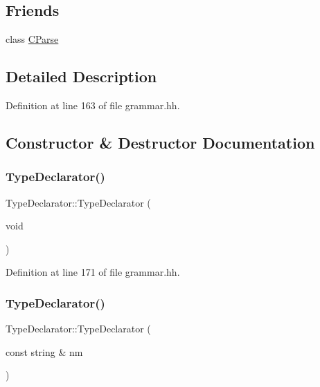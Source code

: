 \subsection*{Friends}
\begin{DoxyCompactItemize}
\item 
class \mbox{\hyperlink{class_type_declarator_a64fbc03374b5d67634430ade1bcbbadd}{C\+Parse}}
\end{DoxyCompactItemize}


\subsection{Detailed Description}


Definition at line 163 of file grammar.\+hh.



\subsection{Constructor \& Destructor Documentation}
\mbox{\label{class_type_declarator_a11bb06dfe9a9b13f10f9c6d04f852926}} 
\subsubsection{\texorpdfstring{TypeDeclarator()}{TypeDeclarator()}\hspace{0.1cm}{\footnotesize\ttfamily [1/2]}}
{\footnotesize\ttfamily Type\+Declarator\+::\+Type\+Declarator (\begin{DoxyParamCaption}\item[{void}]{ }\end{DoxyParamCaption})\hspace{0.3cm}{\ttfamily [inline]}}



Definition at line 171 of file grammar.\+hh.

\mbox{\label{class_type_declarator_a91e78ac3a94f17f0cd24e4b7be994593}} 
\subsubsection{\texorpdfstring{TypeDeclarator()}{TypeDeclarator()}\hspace{0.1cm}{\footnotesize\ttfamily [2/2]}}
{\footnotesize\ttfamily Type\+Declarator\+::\+Type\+Declarator (\begin{DoxyParamCaption}\item[{const string \&}]{nm }\end{DoxyParamCaption})\hspace{0.3cm}{\ttfamily [inline]}}



